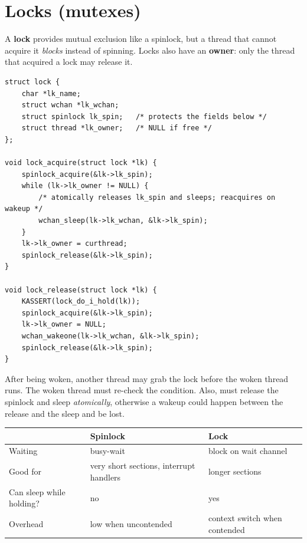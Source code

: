\section{Locks (mutexes)}

A \textbf{lock} provides mutual exclusion like a spinlock, but a thread that cannot acquire it
\emph{blocks} instead of spinning. Locks also have an \textbf{owner}: only the thread that
acquired a lock may release it.

\begin{lstlisting}[style=c]
struct lock {
    char *lk_name;
    struct wchan *lk_wchan;
    struct spinlock lk_spin;   /* protects the fields below */
    struct thread *lk_owner;   /* NULL if free */
};

void lock_acquire(struct lock *lk) {
    spinlock_acquire(&lk->lk_spin);
    while (lk->lk_owner != NULL) {
        /* atomically releases lk_spin and sleeps; reacquires on wakeup */
        wchan_sleep(lk->lk_wchan, &lk->lk_spin);
    }
    lk->lk_owner = curthread;
    spinlock_release(&lk->lk_spin);
}

void lock_release(struct lock *lk) {
    KASSERT(lock_do_i_hold(lk));
    spinlock_acquire(&lk->lk_spin);
    lk->lk_owner = NULL;
    wchan_wakeone(lk->lk_wchan, &lk->lk_spin);
    spinlock_release(&lk->lk_spin);
}
\end{lstlisting}

\begin{important}
After being woken, another thread may grab the lock before the woken thread runs. The woken
thread must re-check the condition. Also,  must release the spinlock and
sleep \emph{atomically}, otherwise a wakeup could happen between the release and the sleep and
be lost.
\end{important}

\begin{center}\small
\begin{tabular}{@{}lll@{}}
\toprule
 & Spinlock & Lock \\
\midrule
Waiting & busy-wait & block on wait channel \\
Good for & very short sections, interrupt handlers & longer sections \\
Can sleep while holding? & no & yes \\
Overhead & low when uncontended & context switch when contended \\
\bottomrule
\end{tabular}
\end{center}

